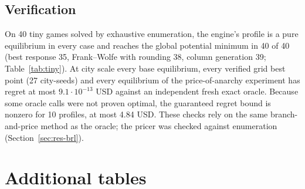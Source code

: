 \documentclass[preprint,11pt]{elsarticle}
\theoremstyle{definition}
\theoremstyle{remark}
\begin{document}
\subsection{Verification}\label{sec:res-verif}

On 40 tiny games solved by exhaustive enumeration, the engine's profile is a pure equilibrium in every case and reaches the global potential minimum in 40 of 40 (best response 35, Frank--Wolfe with rounding 38, column generation 39; Table~\ref{tab:tiny}). At city scale every base equilibrium, every verified grid best point (27 city-seeds) and every equilibrium of the price-of-anarchy experiment has regret at most $9.1\cdot10^{-13}$ USD against an independent fresh exact oracle. Because some oracle calls were not proven optimal, the guaranteed regret bound is nonzero for 10 profiles, at most 4.84 USD. These checks rely on the same branch-and-price method as the oracle; the pricer was checked against enumeration (Section~\ref{sec:res-brl}).

\section{Additional tables}\label{app:tables}

\begin{table}[h]\centering\small
\caption{Methods on the nine city games (seed 0, price-and-branch oracle). $d_{\rm eff}$: active coordinates. Oracle calls and relative potential gap to the convexified optimum, in \%, for best response (BR), ZMC with eight rounds, Frank--Wolfe and column generation with eight rounds (FW, CG8) and column generation to convergence (CG); all methods end with the same best-response polish.}\label{tab:e5}
\end{table}
\end{document}

